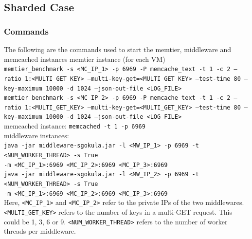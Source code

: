 \documentclass[11pt,a4paper]{article}
\newcommand\instructions[1]{\textcolor{blue}{Instructions: #1}}
\begin{document}
\subsection{Sharded Case}


\subsubsection{Commands}
The following are the commands used to start the memtier, middleware and memcached instances
{\scriptsize
memtier instance (for each VM) \\ 
\texttt{memtier\_benchmark -s <MC\_IP\_1> -p 6969 -P memcache\_text -t 1 -c 2 --ratio 1:<MULTI\_GET\_KEY> --multi-key-get=<MULTI\_GET\_KEY> --test-time 80 --key-maximum 10000 -d 1024 --json-out-file <LOG\_FILE>} \\
\texttt{memtier\_benchmark -s <MC\_IP\_2> -p 6969 -P memcache\_text -t 1 -c 2 --ratio 1:<MULTI\_GET\_KEY> --multi-key-get=<MULTI\_GET\_KEY> --test-time 80 --key-maximum 10000 -d 1024 --json-out-file <LOG\_FILE>} \\
memcached instance: \texttt{memcached -t 1 -p 6969} \\
middleware instances: \\
	\texttt{java -jar middleware-sgokula.jar -l <MW\_IP\_1> -p 6969 -t <NUM\_WORKER\_THREAD> -s True \\ -m <MC\_IP\_1>:6969 <MC\_IP\_2>:6969 <MC\_IP\_3>:6969} \\
	\texttt{java -jar middleware-sgokula.jar -l <MW\_IP\_2> -p 6969 -t <NUM\_WORKER\_THREAD> -s True \\ -m <MC\_IP\_1>:6969 <MC\_IP\_2>:6969 <MC\_IP\_3>:6969} \\ 
}
Here, \texttt{<MC\_IP\_1>} and \texttt{<MC\_IP\_2>} refer to the private IPs of the two middlewares. \texttt{<MULTI\_GET\_KEY>} refers to the number of keys in a multi-GET request. This could be 1, 3, 6 or 9. \texttt{<NUM\_WORKER\_THREAD>} refers to the number of worker threads per middleware.
\end{document}
